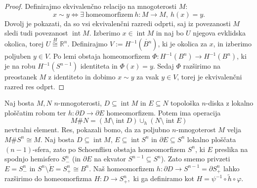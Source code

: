 \documentclass[10pt, a4paper]{article}
\newenvironment{noticeC}{%
  \tcolorbox[%
  notitle,
  empty,
  enhanced,  %
  breakable,
  coltext=black, 
  fontupper=\rmfamily,
  noparskip,
  sharp corners,
  boxrule=-1pt,  %
  frame hidden,
  left=7pt,  %
  right=7pt,
  top=5pt,
  bottom=5pt,
  before skip=2.5ex plus 2pt,
  after skip=2.5ex plus 2pt,
  overlay unbroken and last={%
  },
  ]}
{\endtcolorbox}
\newenvironment{dokaz}%
  {\begin{noticeC}\begin{proof}}%
  {\end{proof}\end{noticeC}}
\newcommand{\R}{\mathbb {R}}
\DeclareMathOperator{\intem}{int}
\begin{document}
\begin{dokaz}
  Definirajmo ekvivalenčno relacijo na mnogoterosti $M$:
  $$x \sim y \Leftrightarrow \exists\ \mathrm{homeomorfizem}\ h: M \to M,\ h(x) = y.$$
  Dovolj je pokazati, da so vsi ekvivalenčni razredi odprti, saj iz povezanosti $M$
  sledi tudi povezanost $\intem M$. Izberimo $x \in \intem M$
  in naj bo $U$ njegova evklidska okolica, torej $U \stackrel{H}{\cong} \R^n$.
  Definirajmo $V := H^{-1}(\mathring{B^n})$, ki je okolica za $x$, in izberimo poljuben 
  $y \in V.$ Po lemi obstaja homeomorfizem $\Phi: H^{-1} (B^n) \to H^{-1} (B^n)$,
  ki je na robu $H^{-1} (S^{n - 1})$ identiteta in $\Phi(x) = y.$
  Sedaj $\Phi$ razširimo na preostanek $M$ z identiteto in dobimo 
  $x \sim y$ za vsak $y \in V$, torej je ekvivalenčni razred res odprt.
\end{dokaz}

Naj bosta $M, N$ $n$-mnogoterosti, $D \subseteq \intem M$ in $E \subseteq N$ topološka $n$-diska z lokalno ploščatim robom 
ter $h: \partial D \to \partial E$ homeomorfizem. Potem ima operacija 
$$M \# N = (M \setminus \intem D) \cup_h (N \setminus \intem E)$$
nevtralni element. Res, pokazali bomo, da za poljubno $n$-mnogoterost $M$ velja $M \# S^n \cong M$.
Naj bosta $D \subseteq \intem M$, $E \subseteq \intem S^n$ in $\partial E \subseteq S^n$ 
lokalno ploščata $(n - 1)$-sfera, zato po Schoenflisu obstaja homeomorfizem $S^n$, ki $E$
preslika na spodnjo hemisfero $S^n_-$ (in $\partial E$ na ekvator $S^{n - 1} \subseteq S^n$).
Zato smemo privzeti $E = S^n_-$ in $S^n \setminus \mathring{E} = S_+^n \cong B^n$.
Naš homeomorfizem $h: \partial D \to S^{n - 1} = \partial S_+ ^n$ lahko razširimo do homeomorfizma 
$H: D \to S_+^n,$ ki ga definiramo kot $H = \psi^{-1} \circ \tilde{h} \circ \varphi.$ 
\end{document}
